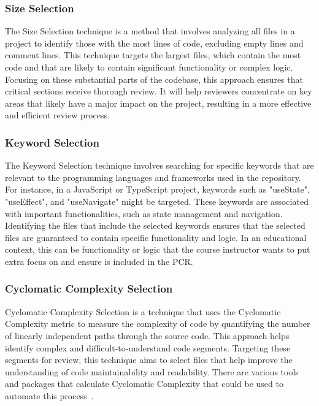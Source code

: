 \subsubsection{Size Selection}
The Size Selection technique is a method that involves analyzing all files in a project to identify those with the most lines of code, excluding empty lines and comment lines. This technique targets the largest files, which contain the most code and that are likely to contain significant functionality or complex logic. Focusing on these substantial parts of the codebase, this approach ensures that critical sections receive thorough review. It will help reviewers concentrate on key areas that likely have a major impact on the project, resulting in a more effective and efficient review process. \\

\subsubsection{Keyword Selection}
The Keyword Selection technique involves searching for specific keywords that are relevant to the programming languages and frameworks used in the repository. For instance, in a JavaScript or TypeScript project, keywords such as "useState", "useEffect", and "useNavigate" might be targeted. These keywords are associated with important functionalities, such as state management and navigation. Identifying the files that include the selected keywords ensures that the selected files are guaranteed to contain specific functionality and logic. In an educational context, this can be functionality or logic that the course instructor wants to put extra focus on and ensure is included in the PCR. \\

\subsubsection{Cyclomatic Complexity Selection}
Cyclomatic Complexity Selection is a technique that uses the Cyclomatic Complexity metric to measure the complexity of code by quantifying the number of linearly independent paths through the source code. This approach helps identify complex and difficult-to-understand code segments. Targeting these segments for review, this technique aims to select files that help improve the understanding of code maintainability and readability. There are various tools and packages that calculate Cyclomatic Complexity that could be used to automate this process~\cite{Cyclomatic_Complexity}. \\


